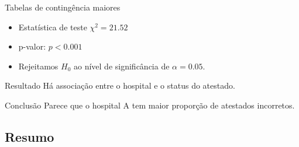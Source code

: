 \documentclass{beamer}
\begin{document}
\begin{frame}{\scriptsize Tabelas de contingência maiores}
  \begin{itemize}
    \scriptsize
  \item Estatística de teste $\chi^2 = 21.52$
  \item p-valor: $p<0.001$ %
  \item Rejeitamos $H_0$ ao nível de significância de $\alpha = 0.05$.
  \end{itemize}
  \bigskip
  \begin{exampleblock}{Resultado}
    \footnotesize
    Há associação entre o hospital e o status do atestado.
  \end{exampleblock}
  \begin{exampleblock}{Conclusão}
    \footnotesize
    Parece que o hospital A tem maior proporção de atestados incorretos.
  \end{exampleblock}
\end{frame}





\subsection{Resumo}
\end{document}
